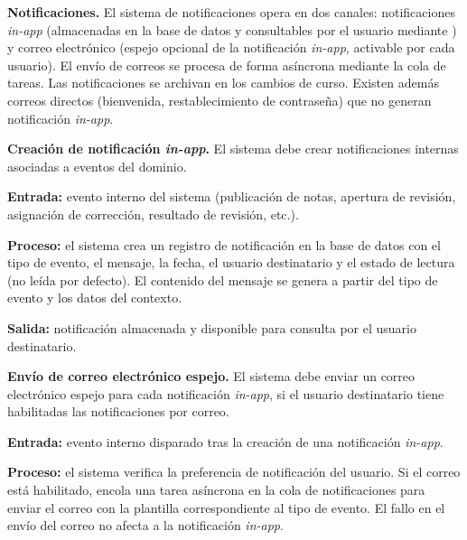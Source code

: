 
\item \textbf{Notificaciones.} \label{rf:notifications}
El sistema de notificaciones opera en dos canales: notificaciones \textit{in-app}
(almacenadas en la base de datos y consultables por el usuario mediante ) y
correo electrónico (espejo opcional de la notificación \textit{in-app}, activable por cada
usuario). El envío de correos se procesa de forma asíncrona mediante la cola de tareas.
Las notificaciones se archivan en los cambios de curso. Existen además correos directos
(bienvenida, restablecimiento de contraseña) que no generan notificación \textit{in-app}.

\begin{functional}

    \item \textbf{Creación de notificación \textit{in-app}.}
    \label{rf:notifications:create}
    El sistema debe crear notificaciones internas asociadas a eventos del dominio.

    \textbf{Entrada:} evento interno del sistema (publicación de notas, apertura de
    revisión, asignación de corrección, resultado de revisión, etc.).

    \textbf{Proceso:} el sistema crea un registro de notificación en la base de datos con el
    tipo de evento, el mensaje, la fecha, el usuario destinatario y el estado de lectura (no
    leída por defecto). El contenido del mensaje se genera a partir del tipo de evento y los
    datos del contexto.

    \textbf{Salida:} notificación almacenada y disponible para consulta por el usuario
    destinatario.

    \item \textbf{Envío de correo electrónico espejo.}
    \label{rf:notifications:email_mirror}
    El sistema debe enviar un correo electrónico espejo para cada notificación
    \textit{in-app}, si el usuario destinatario tiene habilitadas las notificaciones por
    correo.

    \textbf{Entrada:} evento interno disparado tras la creación de una notificación
    \textit{in-app}.

    \textbf{Proceso:} el sistema verifica la preferencia de notificación del usuario. Si el
    correo está habilitado, encola una tarea asíncrona en la cola de notificaciones para
    enviar el correo con la plantilla correspondiente al tipo de evento. El fallo en el
    envío del correo no afecta a la notificación \textit{in-app}.


\end{functional}
